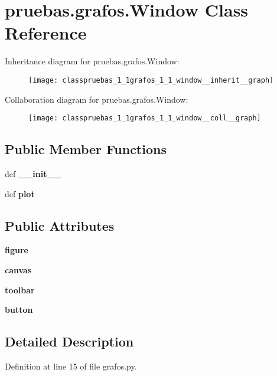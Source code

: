 \section{pruebas.\-grafos.\-Window \-Class \-Reference}
\label{classpruebas_1_1grafos_1_1_window}


\-Inheritance diagram for pruebas.\-grafos.\-Window\-:\nopagebreak
\begin{figure}[H]
\begin{center}
\leavevmode
\texttt{[image: classpruebas\_1\_1grafos\_1\_1\_window\_\_inherit\_\_graph]}
\end{center}
\end{figure}


\-Collaboration diagram for pruebas.\-grafos.\-Window\-:\nopagebreak
\begin{figure}[H]
\begin{center}
\leavevmode
\texttt{[image: classpruebas\_1\_1grafos\_1\_1\_window\_\_coll\_\_graph]}
\end{center}
\end{figure}
\subsection*{\-Public \-Member \-Functions}
\begin{DoxyCompactItemize}
\item 
def {\bf \-\_\-\-\_\-init\-\_\-\-\_\-}
\item 
def {\bf plot}
\end{DoxyCompactItemize}
\subsection*{\-Public \-Attributes}
\begin{DoxyCompactItemize}
\item 
{\bf figure}
\item 
{\bf canvas}
\item 
{\bf toolbar}
\item 
{\bf button}
\end{DoxyCompactItemize}


\subsection{\-Detailed \-Description}


\-Definition at line 15 of file grafos.\-py.



